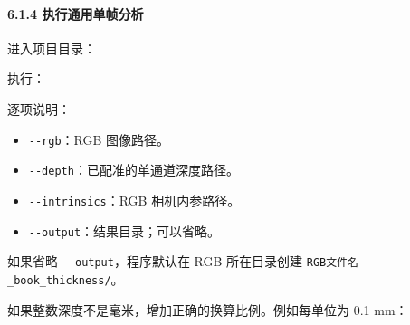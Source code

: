 \documentclass[
  chinese,
  11pt,
  a4paper,
]{article}
\newenvironment{Shaded}{\begin{snugshade}}{\end{snugshade}}
\newcommand{\AttributeTok}[1]{\textcolor[rgb]{0.13,0.29,0.53}{#1}}
\newcommand{\BuiltInTok}[1]{#1}
\newcommand{\DataTypeTok}[1]{\textcolor[rgb]{0.13,0.29,0.53}{#1}}
\newcommand{\NormalTok}[1]{#1}
\newcommand{\OperatorTok}[1]{\textcolor[rgb]{0.81,0.36,0.00}{\textbf{#1}}}
\newcommand{\StringTok}[1]{\textcolor[rgb]{0.31,0.60,0.02}{#1}}
\newcommand{\VariableTok}[1]{\textcolor[rgb]{0.00,0.00,0.00}{#1}}
\providecommand{\tightlist}{%
  \setlength{\itemsep}{0pt}\setlength{\parskip}{0pt}}
\begin{document}
\paragraph{6.1.4
执行通用单帧分析}\label{614-ux6267ux884cux901aux7528ux5355ux5e27ux5206ux6790}

进入项目目录：

\begin{Shaded}
\end{Shaded}

执行：

\begin{Shaded}
\end{Shaded}

逐项说明：

\begin{itemize}
\tightlist
\item
  \texttt{-\/-rgb}：RGB 图像路径。
\item
  \texttt{-\/-depth}：已配准的单通道深度路径。
\item
  \texttt{-\/-intrinsics}：RGB 相机内参路径。
\item
  \texttt{-\/-output}：结果目录；可以省略。
\end{itemize}

如果省略 \texttt{-\/-output}，程序默认在 RGB 所在目录创建
\texttt{RGB文件名\_book\_thickness/}。

如果整数深度不是毫米，增加正确的换算比例。例如每单位为 0.1 mm：
\end{document}
